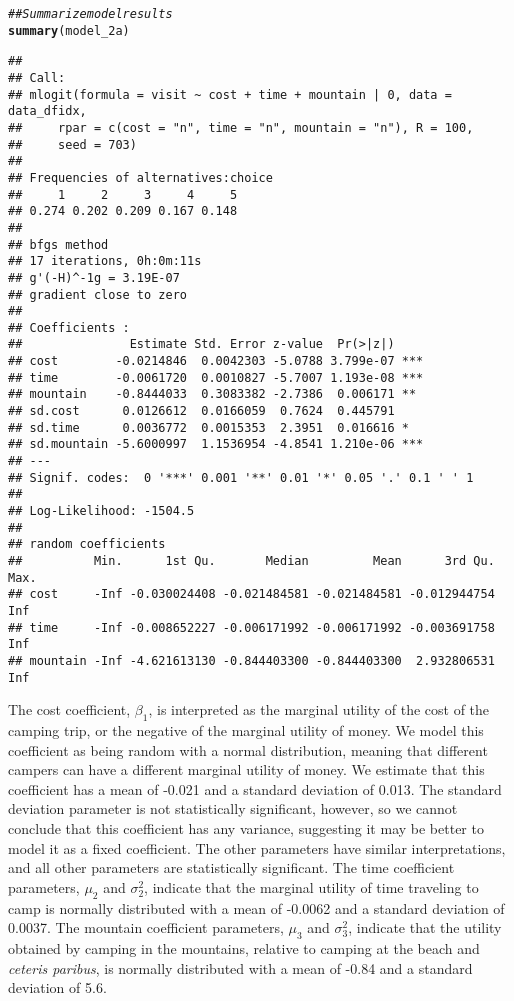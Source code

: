 \documentclass[11pt,letterpaper]{article}\usepackage[]{graphicx}\usepackage[]{xcolor}
\makeatletter
\newcommand{\hlcom}[1]{\textcolor[rgb]{0.678,0.584,0.686}{\textit{#1}}}%
\newcommand{\hlstd}[1]{\textcolor[rgb]{0.345,0.345,0.345}{#1}}%
\newcommand{\hlkwd}[1]{\textcolor[rgb]{0.737,0.353,0.396}{\textbf{#1}}}%
\newenvironment{kframe}{%
 \def\at@end@of@kframe{}%
 \ifinner\ifhmode%
  \def\at@end@of@kframe{\end{minipage}}%
  \begin{minipage}{\columnwidth}%
 \fi\fi%
 \def\FrameCommand##1{\hskip\@totalleftmargin \hskip-\fboxsep
 \colorbox{shadecolor}{##1}\hskip-\fboxsep
     \hskip-\linewidth \hskip-\@totalleftmargin \hskip\columnwidth}%
 \MakeFramed {\advance\hsize-\width
   \@totalleftmargin\z@ \linewidth\hsize
   \@setminipage}}%
 {\par\unskip\endMakeFramed%
 \at@end@of@kframe}
\newenvironment{knitrout}{}{} %
\makeatother
\begin{document}
\begin{enumerate}[label=\alph*., leftmargin=*]
\begin{enumerate}[label=\roman*.]
\begin{knitrout}
\color{fgcolor}\begin{kframe}
\begin{alltt}
\hlcom{## Summarize model results}
\hlkwd{summary}\hlstd{(model_2a)}
\end{alltt}
\begin{verbatim}
## 
## Call:
## mlogit(formula = visit ~ cost + time + mountain | 0, data = data_dfidx, 
##     rpar = c(cost = "n", time = "n", mountain = "n"), R = 100, 
##     seed = 703)
## 
## Frequencies of alternatives:choice
##     1     2     3     4     5 
## 0.274 0.202 0.209 0.167 0.148 
## 
## bfgs method
## 17 iterations, 0h:0m:11s 
## g'(-H)^-1g = 3.19E-07 
## gradient close to zero 
## 
## Coefficients :
##               Estimate Std. Error z-value  Pr(>|z|)    
## cost        -0.0214846  0.0042303 -5.0788 3.799e-07 ***
## time        -0.0061720  0.0010827 -5.7007 1.193e-08 ***
## mountain    -0.8444033  0.3083382 -2.7386  0.006171 ** 
## sd.cost      0.0126612  0.0166059  0.7624  0.445791    
## sd.time      0.0036772  0.0015353  2.3951  0.016616 *  
## sd.mountain -5.6000997  1.1536954 -4.8541 1.210e-06 ***
## ---
## Signif. codes:  0 '***' 0.001 '**' 0.01 '*' 0.05 '.' 0.1 ' ' 1
## 
## Log-Likelihood: -1504.5
## 
## random coefficients
##          Min.      1st Qu.       Median         Mean      3rd Qu. Max.
## cost     -Inf -0.030024408 -0.021484581 -0.021484581 -0.012944754  Inf
## time     -Inf -0.008652227 -0.006171992 -0.006171992 -0.003691758  Inf
## mountain -Inf -4.621613130 -0.844403300 -0.844403300  2.932806531  Inf
\end{verbatim}
\end{kframe}
\end{knitrout}

		The cost coefficient, $\beta_1$, is interpreted as the marginal utility of the cost of the camping trip, or the negative of the marginal utility of money. We model this coefficient as being random with a normal distribution, meaning that different campers can have a different marginal utility of money. We estimate that this coefficient has a mean of -0.021 and a standard deviation of 0.013. The standard deviation parameter is not statistically significant, however, so we cannot conclude that this coefficient has any variance, suggesting it may be better to model it as a fixed coefficient. The other parameters have similar interpretations, and all other parameters are statistically significant. The time coefficient parameters, $\mu_2$ and $\sigma_2^2$, indicate that the marginal utility of time traveling to camp is normally distributed with a mean of -0.0062 and a standard deviation of 0.0037. The mountain coefficient parameters, $\mu_3$ and $\sigma_3^2$, indicate that the utility obtained by camping in the mountains, relative to camping at the beach and \emph{ceteris paribus}, is normally distributed with a mean of -0.84 and a standard deviation of 5.6.
	\end{enumerate}


\end{enumerate}
\end{document}
